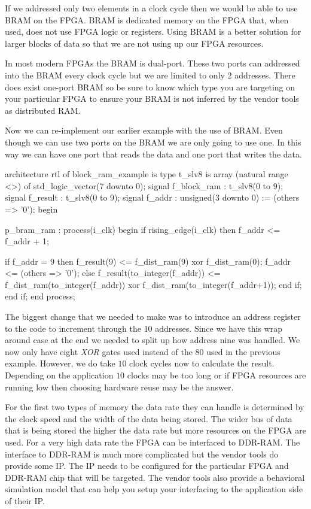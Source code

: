 If we addressed only two elements in a clock cycle then we would be able to use \ac{BRAM} on the \ac{FPGA}. \ac{BRAM} is dedicated memory on the \ac{FPGA} that, when used, does not use \ac{FPGA} logic or registers. Using \ac{BRAM} is a better solution for larger blocks of data so that we are not using up our \ac{FPGA} resources. 

In most modern \ac{FPGA}s the \ac{BRAM} is dual-port. These two ports can addressed into the \ac{BRAM} every clock cycle but we are limited to only $2$ addresses. There does exist one-port \ac{BRAM} so be sure to know which type you are targeting on your particular \ac{FPGA} to ensure your \ac{BRAM} is not inferred by the vendor tools as distributed \ac{RAM}.

Now we can re-implement our earlier example with the use of \ac{BRAM}. Even though we can use two ports on the \ac{BRAM} we are only going to use one. In this way we can have one port that reads the data and one port that writes the data. 

\begin{VHDLlisting}[tabsize=4]
architecture rtl of block_ram_example is
    type t_slv8 is array (natural range <>) of std_logic_vector(7 downto 0);
    signal f_block_ram : t_slv8(0 to 9);
    signal f_result    : t_slv8(0 to 9);
    signal f_addr      : unsigned(3 downto 0) := (others => '0');
begin

p_bram_ram : process(i_clk)
begin
    if rising_edge(i_clk) then
        f_addr <= f_addr + 1;
		
        if f_addr = 9 then
            f_result(9) <= f_dist_ram(9) xor f_dist_ram(0);
            f_addr <= (others => '0');
        else
            f_result(to_integer(f_addr)) <= f_dist_ram(to_integer(f_addr)) xor 
                                            f_dist_ram(to_integer(f_addr+1));
        end if;
    end if;
end process;
\end{VHDLlisting}

The biggest change that we needed to make was to introduce an address register to the code to increment through the $10$ addresses. Since we have this wrap around case at the end we needed to split up how address nine was handled. We now only have eight \emph{XOR} gates used instead of the $80$ used in the previous example. However, we do take $10$ clock cycles now to calculate the result. Depending on the application $10$ clocks may be too long or if \ac{FPGA} resources are running low then choosing hardware reuse may be the answer. 
	
For the first two types of memory the data rate they can handle is determined by the clock speed and the width of the data being stored. The wider bus of data that is being stored the higher the data rate but more resources on the \ac{FPGA} are used. For a very high data rate the \ac{FPGA} can be interfaced to \ac{DDR}-\ac{RAM}. The interface to \ac{DDR}-\ac{RAM} is much more complicated but the vendor tools do provide some \ac{IP}. The \ac{IP} needs to be configured for the particular \ac{FPGA} and \ac{DDR}-\ac{RAM} chip that will be targeted. The vendor tools also provide a behavioral simulation model that can help you setup your interfacing to the application side of their \ac{IP}. 


